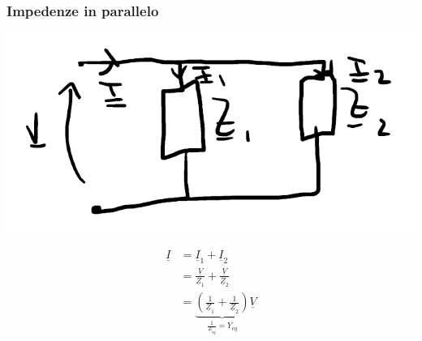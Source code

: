 \documentclass{article}
\begin{document}
\subsubsection*{Impedenze in parallelo}
\begin{center}
    \includegraphics[scale=0.3]{Image/Impedenza-parallelo.png}
\end{center}
\begin{align*}
    \underline{I} &= \underline{I}_1 + \underline{I}_2\\
    &= \frac{\underline{V}}{\underline{Z}_1} + \frac{\underline{V}}{\underline{Z}_2} \\
    &= \underbrace{\left(\frac{1}{\underline{Z}_1} + \frac{1}{\underline{Z}_2}\right)}_{\frac{1}{\underline{Z}_{eq}} = Y_{eq} } \underline{V}
\end{align*}
\end{document}
